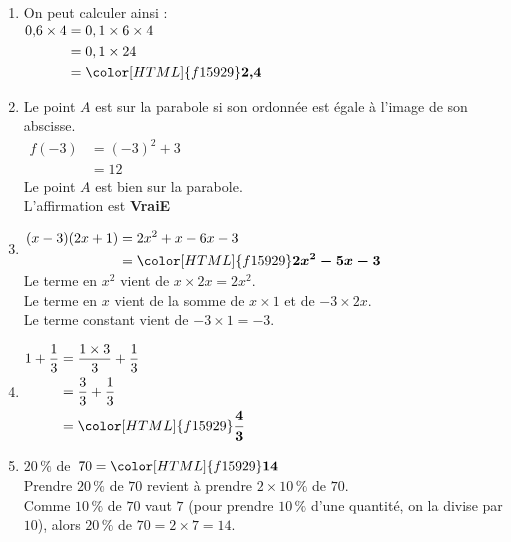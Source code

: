 \documentclass[a4paper,11pt,landscape,exos]{nsi} %
\begin{document}
\begin{multicols}{2}
\maketitle

\begin{enumerate}[itemsep=1em]
    \item On peut calculer ainsi : \\
        $\begin{aligned}
        0{,}6\times4&=0,1\times 6\times4\\
        &=0,1\times 24\\
        &={\color[HTML]{f15929}\boldsymbol{2{,}4}}
        \end{aligned}$
    \item Le point $A$ est sur la parabole si son ordonnée est égale à l'image de son abscisse. \\
        $\begin{aligned}
            f(-3)&=(-3)^2+3\\
            &=12
            \end{aligned}$
            \\
            Le point $A$ est bien sur la parabole.\\ L'affirmation est {\bfseries \color[HTML]{f15929}VraiE}
    \item $\begin{aligned}
          (x-3)(2x+1)&=2x^2+x-6x-3\\
          &={\color[HTML]{f15929}\boldsymbol{2x^2-5x-3}}
          \end{aligned}$\\Le terme en $x^2$ vient de $x\times 2x=2x^2$.\\Le terme en $x$ vient de la somme de $x \times 1$ et de $-3 \times 2x$.\\Le terme constant vient de $-3\times 1= -3$.
    \item $\begin{aligned}
          1+\dfrac{1}{3} &= \dfrac{1 \times 3}{3} + \dfrac{1}{3} \\
          &= \dfrac{3}{3} + \dfrac{1}{3}\\
          &  ={\color[HTML]{f15929}\boldsymbol{\dfrac{4}{3}}}
          \end{aligned}$
\vfill\null
\columnbreak  
    \item $20\,\%$ de $70 = {\color[HTML]{f15929}\boldsymbol{14}}$\\ Prendre $20\,\%$  de $70$ revient à prendre $2\times 10\,\%$  de $70$.\\
          Comme $10\,\%$  de $70$ vaut $7$ (pour prendre $10\,\%$  d'une quantité, on la divise par $10$), alors
          $20\,\%$ de $70=2\times 7=14$.
       

\end{enumerate}
\end{multicols}
\end{document}
